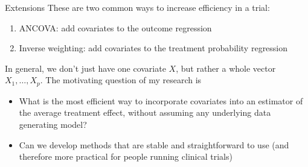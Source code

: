 \documentclass[10pt,t]{beamer}
\begin{document}
\begin{frame}{Extensions}
	These are two common ways to increase efficiency in a trial:
	\begin{enumerate}
		\item ANCOVA: add covariates to the outcome regression
		\item Inverse weighting: add covariates to the treatment probability regression
	\end{enumerate}
	In general, we don't just have one covariate $X$, but rather a whole vector $X_1,\dots, X_p$. The motivating question of my research is
	\begin{itemize}
		\item What is the most efficient way to incorporate covariates into an estimator of the average treatment effect, without assuming any underlying data generating model? 
		\item Can we develop methods that are stable and straightforward to use (and therefore more practical for people running clinical trials)
	\end{itemize}
\end{frame}
\end{document}
